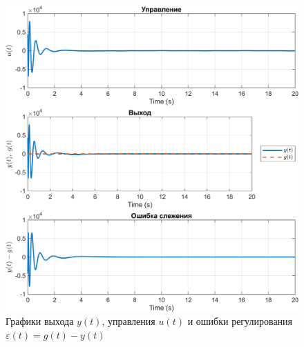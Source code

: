 \begin{figure}[H]
    \centering
    \includegraphics[width=\linewidth]{figs/3_1_0_sim.png}
    \caption{Графики выхода $y(t)$, управления $u(t)$
    и ошибки регулирования $\varepsilon(t) = g(t) - y(t)$}
    \label{fig:3_1_0_sim}
\end{figure}

